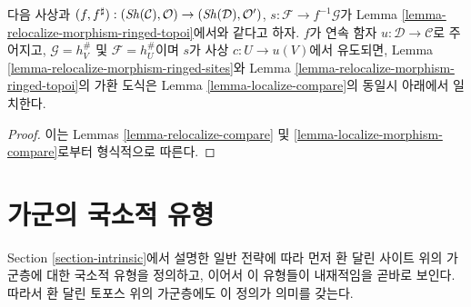 \begin{lemma}
\label{lemma-relocalize-morphism-compare}
다음 사상과
$(f, f^\sharp) :
(\mathop{\mathit{Sh}}\nolimits(\mathcal{C}), \mathcal{O})
\to
(\mathop{\mathit{Sh}}\nolimits(\mathcal{D}), \mathcal{O}')$,
$s : \mathcal{F} \to f^{-1}\mathcal{G}$가
Lemma \ref{lemma-relocalize-morphism-ringed-topoi}에서와 같다고 하자.
$f$가 연속 함자 $u : \mathcal{D} \to \mathcal{C}$로 주어지고,
$\mathcal{G} = h_V^\#$ 및 $\mathcal{F} = h_U^\#$이며 $s$가 사상
$c : U \to u(V)$에서 유도되면, Lemma
\ref{lemma-relocalize-morphism-ringed-sites}와
Lemma \ref{lemma-relocalize-morphism-ringed-topoi}의 가환 도식은
Lemma \ref{lemma-localize-compare}의 동일시 아래에서 일치한다.
\end{lemma}

\begin{proof}
이는 Lemmas \ref{lemma-relocalize-compare} 및
\ref{lemma-localize-morphism-compare}로부터 형식적으로 따른다.
\end{proof}

















\section{가군의 국소적 유형}
\label{section-local}

\noindent
Section \ref{section-intrinsic}에서 설명한 일반 전략에 따라 먼저 환 달린
사이트 위의 가군층에 대한 국소적 유형을 정의하고, 이어서 이 유형들이
내재적임을 곧바로 보인다. 따라서 환 달린 토포스 위의 가군층에도 이 정의가
의미를 갖는다.

